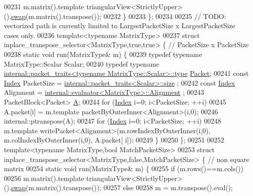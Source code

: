 \begin{DoxyCode}
00231     m.matrix().template triangularView<StrictlyUpper>().\hyperlink{endian_8c_a3ca5ecd34b04d6a243c054ac3a57f68d}{swap}(m.matrix().transpose());
00232   \}
00233 \};
00234 
00235 \textcolor{comment}{// TODO: vectorized path is currently limited to LargestPacketSize x LargestPacketSize cases only.}
00236 \textcolor{keyword}{template}<\textcolor{keyword}{typename} MatrixType>
00237 \textcolor{keyword}{struct }inplace\_transpose\_selector<MatrixType,true,true> \{ \textcolor{comment}{// PacketSize x PacketSize}
00238   \textcolor{keyword}{static} \textcolor{keywordtype}{void} run(MatrixType& m) \{
00239     \textcolor{keyword}{typedef} \textcolor{keyword}{typename} MatrixType::Scalar Scalar;
00240     \textcolor{keyword}{typedef} \textcolor{keyword}{typename} \hyperlink{group___sparse_core___module}{internal::packet\_traits<typename MatrixType::Scalar>::type}
       \hyperlink{group___sparse_core___module}{Packet};
00241     \textcolor{keyword}{const} \hyperlink{namespace_eigen_a62e77e0933482dafde8fe197d9a2cfde}{Index} PacketSize = \hyperlink{struct_eigen_1_1internal_1_1packet__traits}{internal::packet\_traits<Scalar>::size}
      ;
00242     \textcolor{keyword}{const} \hyperlink{namespace_eigen_a62e77e0933482dafde8fe197d9a2cfde}{Index} Alignment = \hyperlink{struct_eigen_1_1internal_1_1evaluator}{internal::evaluator<MatrixType>::Alignment}
      ;
00243     PacketBlock<Packet> \hyperlink{group___core___module_class_eigen_1_1_matrix}{A};
00244     \textcolor{keywordflow}{for} (\hyperlink{namespace_eigen_a62e77e0933482dafde8fe197d9a2cfde}{Index} i=0; i<PacketSize; ++i)
00245       A.packet[i] = m.template packetByOuterInner<Alignment>(i,0);
00246     internal::ptranspose(A);
00247     \textcolor{keywordflow}{for} (\hyperlink{namespace_eigen_a62e77e0933482dafde8fe197d9a2cfde}{Index} i=0; i<PacketSize; ++i)
00248       m.template writePacket<Alignment>(m.rowIndexByOuterInner(i,0), m.colIndexByOuterInner(i,0), A.packet[
      i]);
00249   \}
00250 \};
00251 
00252 \textcolor{keyword}{template}<\textcolor{keyword}{typename} MatrixType,\textcolor{keywordtype}{bool} MatchPacketSize>
00253 \textcolor{keyword}{struct }inplace\_transpose\_selector<MatrixType,false,MatchPacketSize> \{ \textcolor{comment}{// non square matrix}
00254   \textcolor{keyword}{static} \textcolor{keywordtype}{void} run(MatrixType& m) \{
00255     \textcolor{keywordflow}{if} (m.rows()==m.cols())
00256       m.matrix().template triangularView<StrictlyUpper>().\hyperlink{endian_8c_a3ca5ecd34b04d6a243c054ac3a57f68d}{swap}(m.matrix().transpose());
00257     \textcolor{keywordflow}{else}
00258       m = m.transpose().eval();

\end{DoxyCode}

